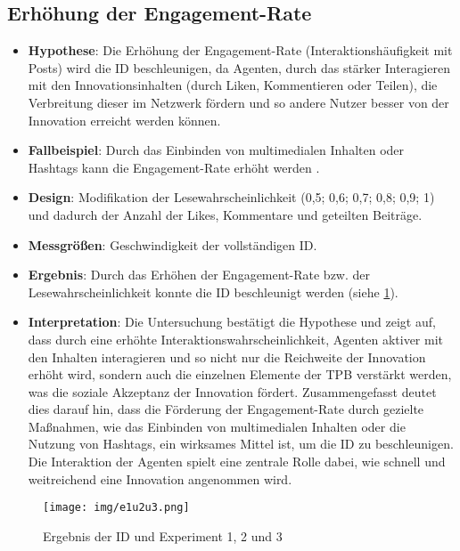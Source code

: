 \documentclass[runningheads]{llncs}
\begin{document}
\subsection{Erhöhung der Engagement-Rate}
\begin{itemize}
  \item \textbf{Hypothese}: Die Erhöhung der Engagement-Rate (Interaktionshäufigkeit mit Posts) wird die ID beschleunigen, da Agenten, durch das stärker Interagieren mit den Innovationsinhalten  (durch Liken, Kommentieren oder Teilen), die Verbreitung dieser im Netzwerk fördern und so andere Nutzer besser von der Innovation erreicht werden können. 
  \item \textbf{Fallbeispiel}: Durch das Einbinden von multimedialen Inhalten oder Hashtags kann die Engagement-Rate erhöht werden \cite{wadhwa_maximizing_2017}.
  \item \textbf{Design}: Modifikation der Lesewahrscheinlichkeit (0,5; 0,6; 0,7; 0,8; 0,9; 1) und dadurch der Anzahl der Likes, Kommentare und geteilten Beiträge. 
  \item \textbf{Messgrößen}: Geschwindigkeit der vollständigen ID.
  \item \textbf{Ergebnis}: Durch das Erhöhen der Engagement-Rate bzw. der Lesewahrscheinlichkeit konnte die ID beschleunigt werden (siehe \ref{fig:e1u2u3}).
  \item \textbf{Interpretation}: Die Untersuchung bestätigt die Hypothese und zeigt auf, dass durch eine erhöhte Interaktionswahrscheinlichkeit, Agenten aktiver mit den Inhalten interagieren und so nicht nur die Reichweite der Innovation erhöht wird, sondern auch die einzelnen Elemente der TPB verstärkt werden, was die soziale Akzeptanz der Innovation fördert. Zusammengefasst deutet dies darauf hin, dass die Förderung der Engagement-Rate durch gezielte Maßnahmen, wie das Einbinden von multimedialen Inhalten oder die Nutzung von Hashtags, ein wirksames Mittel ist, um die ID zu beschleunigen. Die Interaktion der Agenten spielt eine zentrale Rolle dabei, wie schnell und weitreichend eine Innovation angenommen wird.
\end{itemize}
\begin{figure}
  \centering
  \texttt{[image: img/e1u2u3.png]}
  \caption{Ergebnis der ID und Experiment 1, 2 und 3}
  \label{fig:e1u2u3}
\end{figure}
\end{document}
